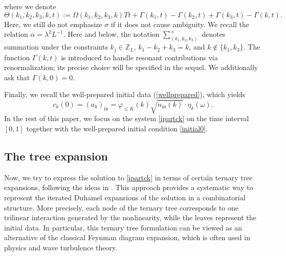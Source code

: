 \documentclass[UTF-8,reqno]{amsart}
\numberwithin{equation}{section}
\theoremstyle{definition}
\def\leq{\leqslant}
\def\leq{\leqslant}
\begin{document}
where we denote
$$\Theta(k_1,k_2,k_3,k,t):=\Omega(k_1,k_2,k_3,k)Tt+ \Gamma(k_1,t)- \Gamma(k_2,t)+ \Gamma(k_3,t)- \Gamma(k,t).$$ Here, we still do not emphasize $\sigma$ if it does not cause ambiguity.
We recall the relation $\alpha =\lambda^2L^{-1}$.  Here and below, the notation $\sum^{\times}_{(k_1,k_2, k_{3})}$ denotes summation under the constraints 
$k_j\in\mathbb{Z}_L$, $k_1-k_2+k_3=k$, and $k\not\in\{k_1,k_3\}$. 
The function $\Gamma(k,t)$ is introduced to handle resonant contributions via renormalization; 
its precise choice will be specified in the sequel. We additionally ask that $\Gamma(k,0)=0$.
 

Finally, we recall the well-prepared initial data (\ref{wellprepared}), which yields
\begin{equation}\label{initial0}
c_k(0)=(a_k)_{\mathrm{in}}=\varphi_{\leq K}(k)\sqrt{n_{\mathrm{in}}(k)} \cdot\eta_{k}(\omega).
\end{equation} 
 In the rest of this paper, we focus on the system \eqref{ipartck} on the time interval $[0,1]$ together with the  well-prepared  initial condition \eqref{initial0}.

\subsection{The tree expansion}
Now, we try to express the solution to \eqref{ipartck} in terms of certain ternary tree expansions, following the ideas in \cite{DH21,DH23a,Vas24,Wu25}. 
This approach provides a systematic way to represent the iterated Duhamel expansions of the solution in a combinatorial structure. 
More precisely, each node of the ternary tree corresponds to one trilinear interaction generated by the nonlinearity, while the leaves represent the initial data.  
In particular, this ternary tree formulation can be viewed as an alternative of the classical Feynman diagram expansion, 
which is often used in physics and wave turbulence theory.
\end{document}
